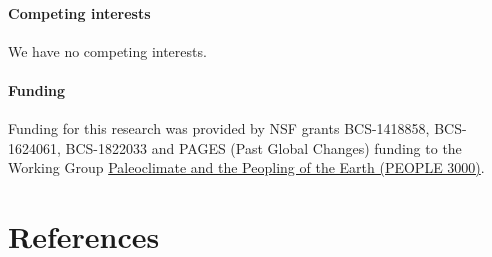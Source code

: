 \documentclass[
]{sa}
\begin{document}
\hypertarget{competing-interests}{%
\paragraph*{Competing interests}\label{competing-interests}}

We have no competing interests.

\hypertarget{funding}{%
\paragraph*{Funding}\label{funding}}

Funding for this research was provided by NSF grants BCS-1418858, BCS-1624061, BCS-1822033 and PAGES (Past Global Changes) funding to the Working Group \href{http://www.pastglobalchanges.org/ini/wg/arctic2k/170-initiatives/working-group/people-3000/1732-people-3000}{Paleoclimate and the Peopling of the Earth (PEOPLE 3000)}.

\newpage

\hypertarget{references}{%
\section*{References}\label{references}}
\end{document}
